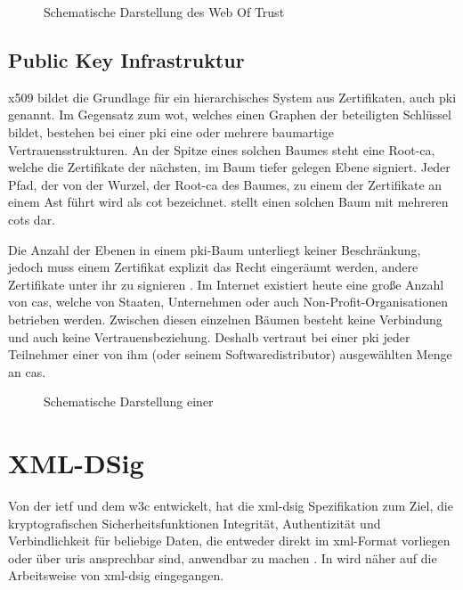\begin{figure}
\centering

\caption{Schematische Darstellung des Web Of Trust}
\label{fig:wot}
\end{figure}

\subsection{Public Key Infrastruktur}
\gls{x509} bildet die Grundlage für ein hierarchisches System aus Zertifikaten, auch \gls{pki} genannt. Im Gegensatz zum \gls{wot}, welches einen Graphen der
beteiligten Schlüssel bildet, bestehen bei einer \gls{pki} eine oder mehrere baumartige Vertrauensstrukturen.
An der Spitze eines solchen Baumes steht eine Root-\gls{ca}, welche die Zertifikate der nächsten, im Baum tiefer gelegen Ebene signiert. Jeder Pfad, der von der
Wurzel, der Root-\gls{ca} des Baumes, zu einem der Zertifikate an einem Ast führt wird als \gls{cot} bezeichnet.  stellt einen solchen Baum mit
mehreren \glspl{cot} dar.

Die Anzahl der Ebenen in einem \gls{pki}-Baum unterliegt keiner Beschränkung, jedoch muss einem Zertifikat explizit das Recht eingeräumt werden, andere
Zertifikate unter ihr zu signieren \cite{kits}. Im Internet existiert heute eine große Anzahl von \glspl{ca}, welche von Staaten, Unternehmen oder auch
Non-Profit-Organisationen betrieben werden. Zwischen diesen einzelnen Bäumen besteht keine Verbindung und auch keine Vertrauensbeziehung. Deshalb vertraut bei
einer \gls{pki} jeder Teilnehmer einer von ihm (oder seinem Softwaredistributor) ausgewählten Menge an \glspl{ca}. \cite{ssliverse:eff}

\begin{figure}
\centering

\caption{Schematische Darstellung einer \texorpdfstring{\protect{}}{PKI}}
\label{fig:cot}
\end{figure}

\section{XML-DSig}
\label{sec:GrundlagenDefinitionen:xml-dsig}
Von der \gls{ietf} und dem \gls{w3c} entwickelt, hat die \gls{xml-dsig} Spezifikation zum Ziel, die kryptografischen Sicherheitsfunktionen Integrität,
Authentizität und Verbindlichkeit für beliebige Daten, die entweder direkt im \gls{xml}-Format vorliegen oder über \glspl{uri} ansprechbar sind, anwendbar zu
machen \cite{xml-dsig:w3c}. In  wird näher auf die Arbeitsweise von \gls{xml-dsig} eingegangen.

